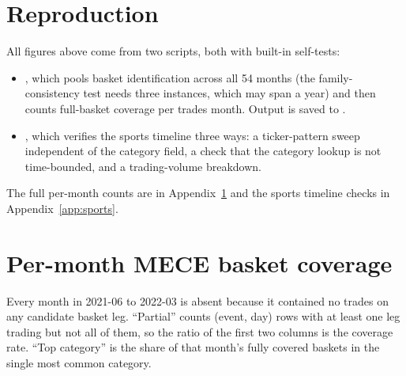 \documentclass[11pt,a4paper]{article}
\begin{document}
\section*{Reproduction}

All figures above come from two scripts, both with built-in self-tests:

\begin{itemize}
  \item {}, which pools
        basket identification across all 54 months (the family-consistency
        test needs three instances, which may span a year) and then counts
        full-basket coverage per trades month. Output is saved to
        .
  \item {}, which
        verifies the sports timeline three ways: a ticker-pattern sweep
        independent of the category field, a check that the category lookup
        is not time-bounded, and a trading-volume breakdown.
\end{itemize}

The full per-month counts are in Appendix~\ref{app:permonth} and the sports
timeline checks in Appendix~\ref{app:sports}.

\appendix

\section{Per-month MECE basket coverage}
\label{app:permonth}

Every month in 2021-06 to 2022-03 is absent because it contained no trades on
any candidate basket leg. ``Partial'' counts (event, day) rows with at least
one leg trading but not all of them, so the ratio of the first two columns is
the coverage rate. ``Top category'' is the share of that month's fully covered
baskets in the single most common category.
\end{document}
